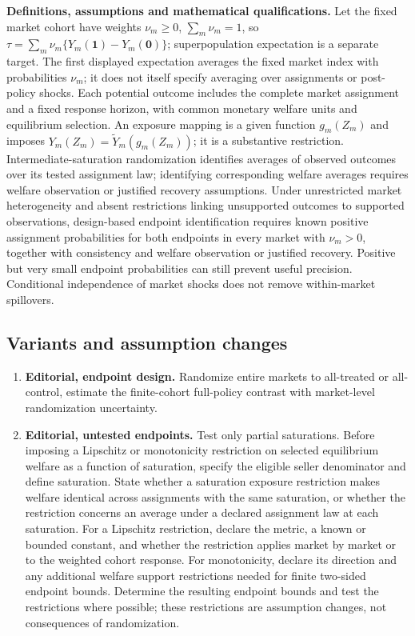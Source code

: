 \documentclass[11pt,a4paper]{article}
\begin{document}
\textbf{Definitions, assumptions and mathematical qualifications.} Let the fixed market cohort have weights \(\nu_m\geq0\), \(\sum_m\nu_m=1\), so \(\tau=\sum_m\nu_m\{Y_m(\mathbf1)-Y_m(\mathbf0)\}\); superpopulation expectation is a separate target. The first displayed expectation averages the fixed market index with probabilities \(\nu_m\); it does not itself specify averaging over assignments or post-policy shocks. Each potential outcome includes the complete market assignment and a fixed response horizon, with common monetary welfare units and equilibrium selection. An exposure mapping is a given function \(g_m(Z_m)\) and imposes \(Y_m(Z_m)=\widetilde Y_m(g_m(Z_m))\); it is a substantive restriction. Intermediate-saturation randomization identifies averages of observed outcomes over its tested assignment law; identifying corresponding welfare averages requires welfare observation or justified recovery assumptions. Under unrestricted market heterogeneity and absent restrictions linking unsupported outcomes to supported observations, design-based endpoint identification requires known positive assignment probabilities for both endpoints in every market with \(\nu_m>0\), together with consistency and welfare observation or justified recovery. Positive but very small endpoint probabilities can still prevent useful precision. Conditional independence of market shocks does not remove within-market spillovers.
\subsection*{Variants and assumption changes}
\begin{enumerate}
\item \textbf{Editorial, endpoint design.} Randomize entire markets to all-treated or all-control, estimate the finite-cohort full-policy contrast with market-level randomization uncertainty.
\item \textbf{Editorial, untested endpoints.} Test only partial saturations. Before imposing a Lipschitz or monotonicity restriction on selected equilibrium welfare as a function of saturation, specify the eligible seller denominator and define saturation. State whether a saturation exposure restriction makes welfare identical across assignments with the same saturation, or whether the restriction concerns an average under a declared assignment law at each saturation. For a Lipschitz restriction, declare the metric, a known or bounded constant, and whether the restriction applies market by market or to the weighted cohort response. For monotonicity, declare its direction and any additional welfare support restrictions needed for finite two-sided endpoint bounds. Determine the resulting endpoint bounds and test the restrictions where possible; these restrictions are assumption changes, not consequences of randomization.
\end{enumerate}
\end{document}
